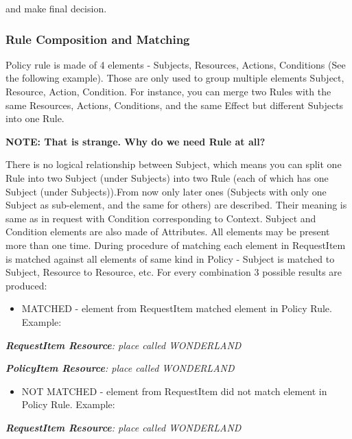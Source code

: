 \documentclass{article}
\newcommand\liststyleWWviiiNumxx{%
\renewcommand\theenumi{\arabic{enumi}}
\renewcommand\theenumii{\arabic{enumii}}
\renewcommand\theenumiii{\arabic{enumiii}}
\renewcommand\labelitemi{o}
\renewcommand\labelenumi{\theenumi.}
\renewcommand\labelenumii{\theenumii.}
\renewcommand\labelenumiii{\theenumiii.}
}
\begin{document}
{\color{black}
and make final decision.}


\bigskip

\subsubsection{Rule Composition and Matching}
{\color{black}
Policy rule is made of 4 elements - Subjects, Resources, Actions,
Conditions (See the following example). Those are only used to group
multiple elements Subject, Resource, Action, Condition. For instance,
you can merge two Rules with the same Resources, Actions, Conditions,
and the same {\textquotedbl}Effect{\textquotedbl} but different
Subjects into one Rule.}

{\bfseries\color{black}
NOTE: That is strange. Why do we need Rule at all?}

{\color{black}
There is no logical relationship between Subject, which means you can
split one Rule into two Subject (under Subjects) into two Rule (each of
which has one Subject (under Subjects)).From now only later ones
(Subjects with only one Subject as sub-element, and the same for
others) are described. Their meaning is same as in request with
Condition corresponding to Context. Subject and Condition elements are
also made of Attributes. All elements may be present more than one
time. During procedure of matching each element in RequestItem is
matched against all elements of same kind in Policy - Subject is
matched to Subject, Resource to Resource, etc. For every combination 3
possible results are produced:}

\liststyleWWviiiNumxx
\begin{itemize}
\item {\color{black}
MATCHED - element from RequestItem matched element in Policy Rule.
Example:}
\end{itemize}
{\upshape\color{black}
\foreignlanguage{english}{\textbf{\textit{RequestItem
Resource}}}\foreignlanguage{english}{\textit{: place called
WONDERLAND}}}

{\upshape\color{black}
\foreignlanguage{english}{\textbf{\textit{PolicyItem
Resource}}}\foreignlanguage{english}{\textit{: place called
WONDERLAND}}}

\liststyleWWviiiNumxx
\begin{itemize}
\item {\color{black}
NOT MATCHED - element from RequestItem did not match element in Policy
Rule. Example:}
\end{itemize}
{\upshape\color{black}
\foreignlanguage{english}{\textbf{\textit{RequestItem
Resource}}}\foreignlanguage{english}{\textit{: place called
WONDERLAND}}}
\end{document}
